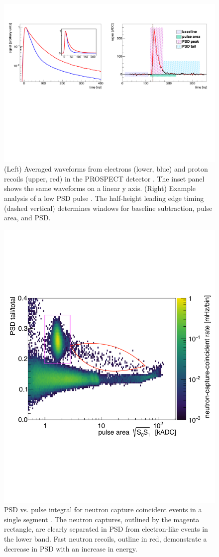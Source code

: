\begin{figure}[t]
	\centering
	\includegraphics[width=0.99\linewidth]{tex/5-analysis-images/PSD_Define}
	\caption{(Left) Averaged waveforms from electrons (lower, blue) and proton recoils (upper, red) in the PROSPECT detector \cite{MM:2773}. The inset panel shows the same waveforms on a linear y axis. (Right) Example analysis of a low PSD pulse \cite{MM:2764}. The half-height leading edge timing (dashed vertical) determines windows for baseline subtraction, pulse area, and PSD. }
	\label{fig:psddefine}
\end{figure}

\begin{figure}[h]
	\centering
	\includegraphics[width=0.6\linewidth]{tex/5-analysis-images/PSD_vs_S_NRC}
	\caption{PSD vs. pulse integral for neutron capture coincident events in a single segment \cite{MM:2731}. The neutron captures, outlined by the magenta rectangle, are clearly separated in PSD from electron-like events in the lower band. Fast neutron recoils, outline in red, demonstrate a decrease in PSD with an increase in energy.}
	\label{fig:psdvss}
\end{figure}


